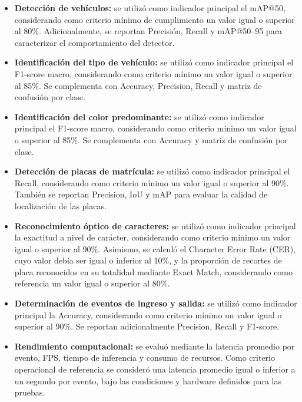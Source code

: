 \begin{itemize}
    \item \textbf{Detección de vehículos:} se utilizó como indicador principal
        el mAP@50, considerando como criterio mínimo de cumplimiento un valor
        igual o superior al 80\%. Adicionalmente, se reportan Precisión,
        Recall y mAP@50--95 para caracterizar el comportamiento del detector.

    \item \textbf{Identificación del tipo de vehículo:} se utilizó como
        indicador principal el F1-score macro, considerando como criterio mínimo
        un valor igual o superior al 85\%. Se complementa con Accuracy,
        Precision, Recall y matriz de confusión por clase.

    \item \textbf{Identificación del color predominante:} se utilizó como
        indicador principal el F1-score macro, considerando como criterio mínimo
        un valor igual o superior al 85\%. Se complementa con Accuracy y matriz
        de confusión por clase.

    \item \textbf{Detección de placas de matrícula:} se utilizó como indicador
        principal el Recall, considerando como criterio mínimo un valor igual o
        superior al 90\%. También se reportan Precision, IoU y mAP para evaluar
        la calidad de localización de las placas.

    \item \textbf{Reconocimiento óptico de caracteres:} se utilizó como indicador
        principal la exactitud a nivel de carácter, considerando como criterio
        mínimo un valor igual o superior al 90\%. Asimismo, se calculó el
        Character Error Rate (CER), cuyo valor debía ser igual o inferior al 10\%,
        y la proporción de recortes de placa reconocidos en su totalidad
        mediante Exact Match, considerando como referencia un valor igual o
        superior al 80\%.

    \item \textbf{Determinación de eventos de ingreso y salida:} se utilizó
        como indicador principal la Accuracy, considerando como criterio mínimo
        un valor igual o superior al 90\%. Se reportan adicionalmente
        Precision, Recall y F1-score.

    \item \textbf{Rendimiento computacional:} se evaluó mediante la latencia
        promedio por evento, FPS, tiempo de inferencia y consumo de recursos.
        Como criterio operacional de referencia se consideró una latencia
        promedio igual o inferior a un segundo por evento, bajo las condiciones
        y hardware definidos para las pruebas.
\end{itemize}

